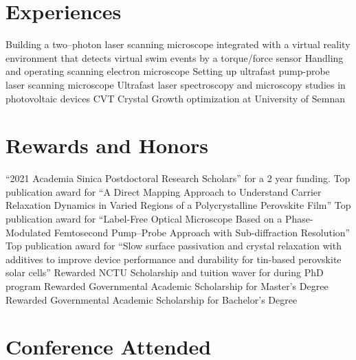 \documentclass[11pt,a4paper]{moderncv}
\begin{document}
\section{Experiences}
		{Building a two--photon laser scanning microscope 
		integrated with a virtual reality environment 
		that detects virtual swim events by a torque/force sensor}
		{Handling and operating scanning electron microscope}
		{Setting up ultrafast pump-probe laser scanning microscope}
		{Ultrafast laser spectroscopy and microscopy
	studies in photovoltaic devices }
		{CVT Crystal Growth optimization at University of Semnan}
\section{Rewards and Honors}
		{``2021 Academia Sinica Postdoctoral 
		Research Scholars'' for a 2 year funding.}
		{Top publication award for ``A Direct Mapping 
		Approach to Understand Carrier Relaxation 
		Dynamics in Varied Regions of a 
		Polycrystalline Perovskite Film''}
		{Top publication award for ``Label-Free Optical 
		Microscope Based on a Phase-Modulated Femtosecond 
		Pump–Probe Approach with Sub-diffraction Resolution''}
		{Top publication award for ``Slow surface 
		passivation and crystal relaxation with additives to 
		improve device performance and durability for tin-based 
		perovskite solar cells''}
		{Rewarded NCTU Scholarship and tuition waver 
		for during PhD program}
		{Rewarded Governmental Academic Scholarship 
		for Master's Degree}
		{Rewarded Governmental Academic Scholarship 
		for Bachelor's Degree}
\section{Conference Attended}
\end{document}
